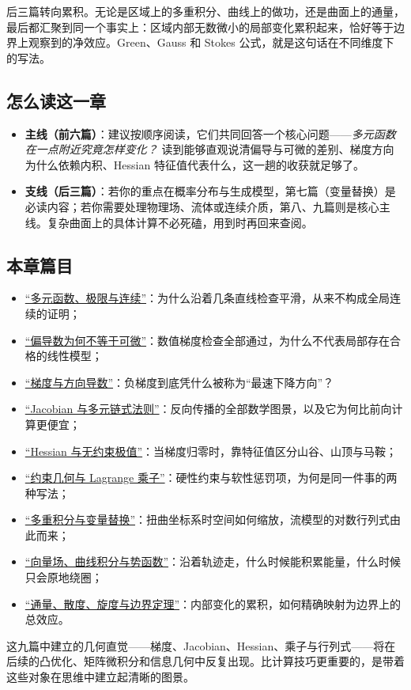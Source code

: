 后三篇转向累积。无论是区域上的多重积分、曲线上的做功，还是曲面上的通量，最后都汇聚到同一个事实上：区域内部无数微小的局部变化累积起来，恰好等于边界上观察到的净效应。Green、Gauss 和 Stokes 公式，就是这句话在不同维度下的写法。

\subsection*{怎么读这一章}

\begin{itemize}
    \item \textbf{主线（前六篇）}：建议按顺序阅读，它们共同回答一个核心问题——\emph{多元函数在一点附近究竟怎样变化？} 读到能够直观说清偏导与可微的差别、梯度方向为什么依赖内积、Hessian 特征值代表什么，这一趟的收获就足够了。
    \item \textbf{支线（后三篇）}：若你的重点在概率分布与生成模型，第七篇（变量替换）是必读内容；若你需要处理物理场、流体或连续介质，第八、九篇则是核心主线。复杂曲面上的具体计算不必死磕，用到时再回来查阅。
\end{itemize}

\subsection*{本章篇目}

\begin{itemize}
    \item \hyperref[sec:02-Calculus/06-Multivariable-Calculus/01]{``多元函数、极限与连续''}：为什么沿着几条直线检查平滑，从来不构成全局连续的证明；
    \item \hyperref[sec:02-Calculus/06-Multivariable-Calculus/02]{``偏导数为何不等于可微''}：数值梯度检查全部通过，为什么不代表局部存在合格的线性模型；
    \item \hyperref[sec:02-Calculus/06-Multivariable-Calculus/03]{``梯度与方向导数''}：负梯度到底凭什么被称为``最速下降方向''？
    \item \hyperref[sec:02-Calculus/06-Multivariable-Calculus/04]{``Jacobian 与多元链式法则''}：反向传播的全部数学图景，以及它为何比前向计算更便宜；
    \item \hyperref[sec:02-Calculus/06-Multivariable-Calculus/05]{``Hessian 与无约束极值''}：当梯度归零时，靠特征值区分山谷、山顶与马鞍；
    \item \hyperref[sec:02-Calculus/06-Multivariable-Calculus/06]{``约束几何与 Lagrange 乘子''}：硬性约束与软性惩罚项，为何是同一件事的两种写法；
    \item \hyperref[sec:02-Calculus/06-Multivariable-Calculus/07]{``多重积分与变量替换''}：扭曲坐标系时空间如何缩放，流模型的对数行列式由此而来；
    \item \hyperref[sec:02-Calculus/06-Multivariable-Calculus/08]{``向量场、曲线积分与势函数''}：沿着轨迹走，什么时候能积累能量，什么时候只会原地绕圈；
    \item \hyperref[sec:02-Calculus/06-Multivariable-Calculus/09]{``通量、散度、旋度与边界定理''}：内部变化的累积，如何精确映射为边界上的总效应。
\end{itemize}

这九篇中建立的几何直觉——梯度、Jacobian、Hessian、乘子与行列式——将在后续的凸优化、矩阵微积分和信息几何中反复出现。比计算技巧更重要的，是带着这些对象在思维中建立起清晰的图景。